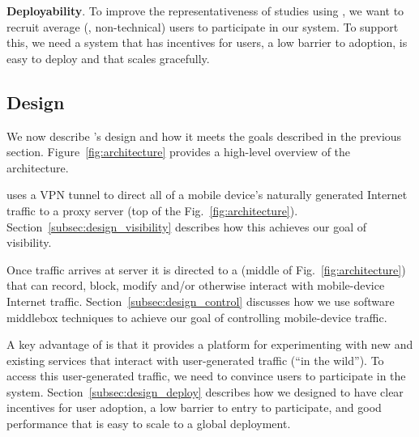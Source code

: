 \noindent\textbf{Deployability}. To improve the representativeness of studies using \meddle, we want to 
recruit average (\ie, non-technical) users to participate in our system. To support this, we need a system 
that has incentives for users, a low barrier to adoption, is easy to deploy and that scales gracefully. 
  
  

\subsection{Design}

We now describe \meddle's design and how 
it meets the goals described in the previous section. Figure~\ref{fig:architecture} 
provides a high-level overview of the \meddle architecture.

\meddle uses a VPN tunnel to direct all of a 
mobile device's naturally generated Internet traffic to a proxy server (top of the Fig.~\ref{fig:architecture}). 
Section~\ref{subsec:design_visibility} describes how this achieves our goal of visibility.

Once traffic arrives at \meddle server it is directed to a \meddlebox (middle of Fig.~\ref{fig:architecture}) 
that can record, block, modify and/or otherwise interact 
with mobile-device Internet traffic. Section~\ref{subsec:design_control} discusses how we 
use software middlebox techniques to achieve our goal of controlling mobile-device traffic. 

A key advantage of \meddle is that it provides a platform for experimenting 
with new and existing services that interact with user-generated traffic (\ie ``in the wild''). 
To access this user-generated traffic, we need to convince users to participate in the system. 
Section~\ref{subsec:design_deploy} describes how we designed \meddle to have clear 
incentives for user adoption, a low barrier to entry to participate, and good performance that 
is easy to scale to a global deployment.


